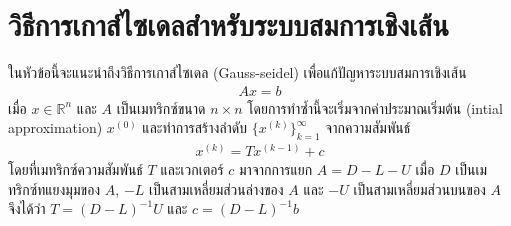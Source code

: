 \section{วิธีการเกาส์ไซเดลสำหรับระบบสมการเชิงเส้น}


\hspace{1cm}  ในหัวข้อนี้จะแนะนำถึงวิธีการเกาส์ไซเดล (Gauss-seidel) เพื่อแก้ปัญหาระบบสมการเชิงเส้น 
\begin{align}
    Ax = b
    \label{equation:linearquation_system}
\end{align}
เมื่อ $x \in \mathbb{R}^{n}$ และ $A$ เป็นเมทริกซ์ขนาด $n \times n$ โดยการทำซ้ำนี้จะเริ่มจากค่าประมาณเริ่มต้น (intial approximation) $x^{(0)}$ และทำการสร้างลำดับ $\{ x^{(k)} \}_{k=1}^\infty$ จากความสัมพันธ์
\begin{align}
    x^{(k)} = Tx^{(k-1)} + c
\end{align}
โดยที่เมทริกซ์ความสัมพันธ์ $T$ และเวกเตอร์ $c$ มาจากการแยก $A = D - L - U$ เมื่อ $D$ เป็นเมทริกซ์ทแยงมุมของ $A$, $-L$ เป็นสามเหลี่ยมส่วนล่างของ $A$ และ $-U$ เป็นสามเหลี่ยมส่วนบนของ $A$ จึงได้ว่า $T = (D-L)^{-1}U$ และ $c = (D-L)^{-1}b$